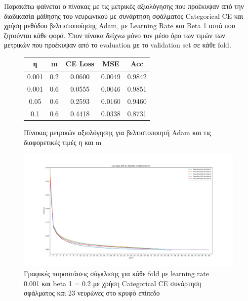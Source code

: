 \documentclass[12pt,a4paper]{article}
\begin{document}
Παρακάτω φαίνεται ο πίνακας με τις μετρικές αξιολόγησης που προέκυψαν από την διαδικασία μάθησης του νευρωνικού με συνάρτηση σφάλματος Categorical CE και χρήση μεθόδου βελτιστοποίησης Adam, με Learning Rate και Beta 1 αυτά που ζητούνται κάθε φορά. Στον πίνακα δείχνω μόνο τον μέσο όρο των τιμών των μετρικών που προέκυψαν από το evaluation με το validation set σε κάθε fold.

\begin{figure}[H]
    \begin{center}
    \begin{tabular}{ |c|c|c|c|c| } 
        \hline
        \textbf{η} & \textbf{m} & \textbf{CE Loss} & \textbf{MSE} & \textbf{Acc} \\ \hline
        0.001 & 0.2 & 0.0600 & 0.0049 & 0.9842 \\
        \hline
        0.001 & 0.6 & 0.0555 & 0.0046 & 0.9851 \\
        \hline
        0.05  & 0.6 & 0.2593 & 0.0160 & 0.9460 \\ 
        \hline
        0.1   & 0.6 & 0.4418 & 0.0338 & 0.8731 \\ 
        \hline
    \end{tabular}
    \end{center}
    \caption{Πίνακας μετρικών αξιολόγησης για βελτιστοποιητή Adam και τις διαφορετικές τιμές η και m}
\end{figure}

\begin{figure}[H]
	\includegraphics[width=\textwidth]{24. LR 0.001 - Beta1 0.2.png}
	\caption{Γραφικές παραστάσεις σύγκλισης για κάθε fold με learning rate = 0.001 και beta 1 = 0.2 με χρήση Categorical CE συνάρτηση σφάλματος και 23 νευρώνες στο κρυφό επίπεδο}
\end{figure}
\end{document}
